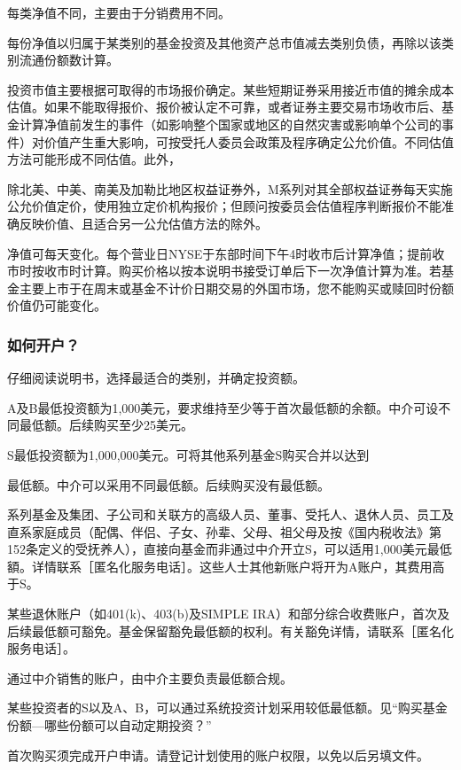 \documentclass[UTF8,fontset=none,11pt,a4paper]{ctexart}
\begin{document}
每类净值不同，主要由于分销费用不同。

每份净值以归属于某类别的基金投资及其他资产总市值减去类别负债，再除以该类别流通份额数计算。

投资市值主要根据可取得的市场报价确定。某些短期证券采用接近市值的摊余成本估值。如果不能取得报价、报价被认定不可靠，或者证券主要交易市场收市后、基金计算净值前发生的事件（如影响整个国家或地区的自然灾害或影响单个公司的事件）对价值产生重大影响，可按受托人委员会政策及程序确定公允价值。不同估值方法可能形成不同估值。此外，

除北美、中美、南美及加勒比地区权益证券外，M系列对其全部权益证券每天实施公允价值定价，使用独立定价机构报价；但顾问按委员会估值程序判断报价不能准确反映价值、且适合另一公允估值方法的除外。

净值可每天变化。每个营业日NYSE于东部时间下午4时收市后计算净值；提前收市时按收市时计算。购买价格以按本说明书接受订单后下一次净值计算为准。若基金主要上市于在周末或基金不计价日期交易的外国市场，您不能购买或赎回时份额价值仍可能变化。

\subsubsection*{如何开户？}
仔细阅读说明书，选择最适合的类别，并确定投资额。

A及B最低投资额为1,000美元，要求维持至少等于首次最低额的余额。中介可设不同最低额。后续购买至少25美元。

S最低投资额为1,000,000美元。可将其他系列基金S购买合并以达到


\par{}\label{originalpage11}
最低额。中介可以采用不同最低额。后续购买没有最低额。

系列基金及集团、子公司和关联方的高级人员、董事、受托人、退休人员、员工及直系家庭成员（配偶、伴侣、子女、孙辈、父母、祖父母及按《国内税收法》第152条定义的受抚养人），直接向基金而非通过中介开立S，可以适用1,000美元最低額。详情联系［匿名化服务电话］。这些人士其他新账户将开为A账户，其费用高于S。

某些退休账户（如401(k)、403(b)及SIMPLE IRA）和部分综合收费账户，首次及后续最低额可豁免。基金保留豁免最低额的权利。有关豁免详情，请联系［匿名化服务电话］。

通过中介销售的账户，由中介主要负责最低额合规。

某些投资者的S以及A、B，可以通过系统投资计划采用较低最低额。见“购买基金份额—哪些份额可以自动定期投资？”

首次购买须完成开户申请。请登记计划使用的账户权限，以免以后另填文件。
\end{document}
